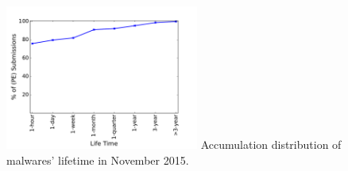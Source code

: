 \begin{figure}[t!]
\begin{center}
\includegraphics[width=2.5in]{figure/lifetime}
{Accumulation distribution of malwares' lifetime in November 2015.}
\end{center}
\vspace{-0.25in}
\end{figure}
